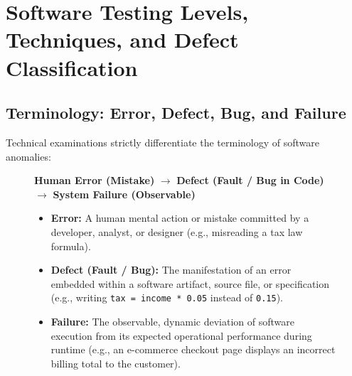 \section{Software Testing Levels, Techniques, and Defect Classification}
\label{sec:se_software_testing}

\subsection{Terminology: Error, Defect, Bug, and Failure}
Technical examinations strictly differentiate the terminology of software anomalies:
\begin{figure}[htbp]
\centering
\begin{tcolorbox}[colback=codebg, colframe=primary, title=\textbf{The Chain of Software Pathology}]
\begin{center}
\textbf{Human Error (Mistake)} $\longrightarrow$ \textbf{Defect (Fault / Bug in Code)} $\longrightarrow$ \textbf{System Failure (Observable)}
\end{center}
\begin{itemize}
    \item \textbf{Error:} A human mental action or mistake committed by a developer, analyst, or designer (e.g., misreading a tax law formula).
    \item \textbf{Defect (Fault / Bug):} The manifestation of an error embedded within a software artifact, source file, or specification (e.g., writing \texttt{tax = income * 0.05} instead of \texttt{0.15}).
    \item \textbf{Failure:} The observable, dynamic deviation of software execution from its expected operational performance during runtime (e.g., an e-commerce checkout page displays an incorrect billing total to the customer).
\end{itemize}
\end{tcolorbox}
\end{figure}

